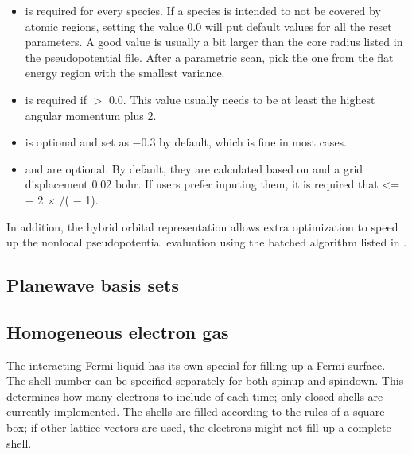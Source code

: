 \documentclass[letterpaper,10pt,english]{sphinxmanual}
\begin{document}
\begin{itemize}
\item {} 
  is required for every species. If a species is intended to not be covered by atomic regions, setting the value 0.0 will put default values for all the reset parameters. A good value is usually a bit larger than the core radius listed in the pseudopotential file. After a parametric scan, pick the one from the flat energy region with the smallest variance.

\item {} 
 is required if  \(>\) 0.0. This value usually needs to be at least the highest angular momentum plus 2.

\item {} 
 is optional and set as  \(-0.3\) by default, which is fine in most cases.

\item {} 
 and  are optional. By default, they are calculated based on  and a grid displacement 0.02 bohr.
If users prefer inputing them, it is required that  \textless{}=   \(-\) 2 \(\times\) /( \(-\) 1).

\end{itemize}

In addition, the hybrid orbital representation allows extra optimization to speed up the nonlocal pseudopotential evaluation using the batched algorithm listed in {\hyperref[\detokenize{hamiltonianobservable:nlpp}]{}}.


\subsection{Plane\sphinxhyphen{}wave basis sets}
\label{\detokenize{intro_wavefunction:plane-wave-basis-sets}}\label{\detokenize{intro_wavefunction:pwbasis}}

\subsection{Homogeneous electron gas}
\label{\detokenize{intro_wavefunction:homogeneous-electron-gas}}\label{\detokenize{intro_wavefunction:hegbasis}}
The interacting Fermi liquid has its own special  for filling up a
Fermi surface.  The shell number can be specified separately for both spin\sphinxhyphen{}up and spin\sphinxhyphen{}down.
This determines how many electrons to include of each time; only closed shells are currently
implemented.  The shells are filled according to the rules of a square box; if other lattice
vectors are used, the electrons might not fill up a complete shell.
\end{document}
